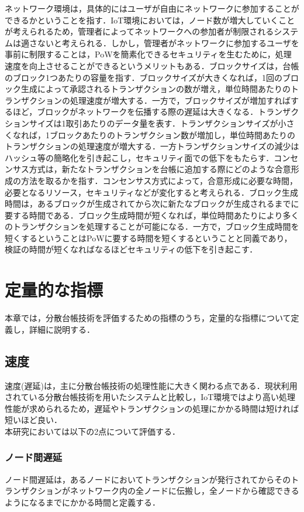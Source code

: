 \documentclass[japanese, macos]{KU2}
\begin{document}
ネットワーク環境は，具体的にはユーザが自由にネットワークに参加することができるかということを指す．IoT環境においては，ノード数が増大していくことが考えられるため，管理者によってネットワークへの参加者が制限されるシステムは適さないと考えられる．しかし，管理者がネットワークに参加するユーザを事前に制限することは，PoWを簡素化できるセキュリティを生むために，処理速度を向上させることができるというメリットもある．ブロックサイズは，台帳のブロック1つあたりの容量を指す．ブロックサイズが大きくなれば，1回のブロック生成によって承認されるトランザクションの数が増え，単位時間あたりのトランザクションの処理速度が増大する．一方で，ブロックサイズが増加すればするほど，ブロックがネットワークを伝播する際の遅延は大きくなる．トランザクションサイズは1取引あたりのデータ量を表す．トランザクションサイズが小さくなれば，1ブロックあたりのトランザクション数が増加し，単位時間あたりのトランザクションの処理速度が増大する．一方トランザクションサイズの減少はハッシュ等の簡略化を引き起こし，セキュリティ面での低下をもたらす．コンセンサス方式は，新たなトランザクションを台帳に追加する際にどのような合意形成の方法を取るかを指す．コンセンサス方式によって，合意形成に必要な時間，必要となるリソース，セキュリティなどが変化すると考えられる．ブロック生成時間は，あるブロックが生成されてから次に新たなブロックが生成されるまでに要する時間である．ブロック生成時間が短くなれば，単位時間あたりにより多くのトランザクションを処理することが可能になる．一方で，ブロック生成時間を短くするということはPoWに要する時間を短くするということと同義であり，検証の時間が短くなればなるほどセキュリティの低下を引き起こす．\\

\chapter{定量的な指標}
本章では，分散台帳技術を評価するための指標のうち，定量的な指標について定義し，詳細に説明する．

\section{速度}
速度(遅延)は，主に分散台帳技術の処理性能に大きく関わる点である．現状利用されている分散台帳技術を用いたシステムと比較し，IoT環境ではより高い処理性能が求められるため，遅延やトランザクションの処理にかかる時間は短ければ短いほど良い．\\
本研究においては以下の2点について評価する．
\subsection{ノード間遅延}
ノード間遅延は，あるノードにおいてトランザクションが発行されてからそのトランザクションがネットワーク内の全ノードに伝搬し，全ノードから確認できるようになるまでにかかる時間と定義する．
\end{document}
